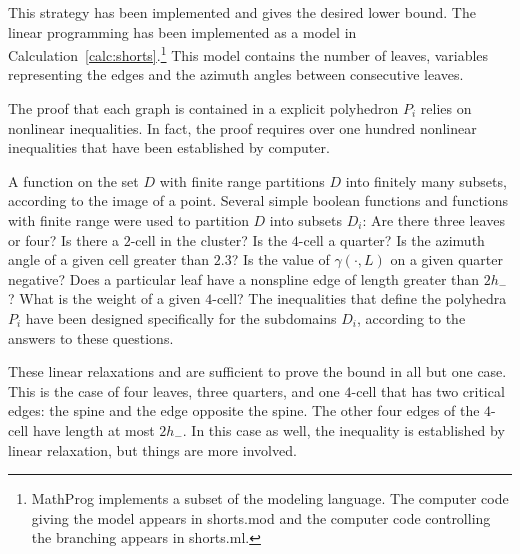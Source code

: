 This strategy has been implemented and gives the desired lower bound.
The linear programming has been implemented as a  model
in Calculation~\ref{calc:shorts}.\footnote{MathProg implements a
subset of the  modeling language.  The computer code
giving the model appears in shorts.mod and the computer code
controlling the branching appears in shorts.ml.}  This model
contains the number of leaves, variables representing the edges and
the azimuth angles between consecutive leaves.

The proof that each graph is contained in a explicit polyhedron $P_i$
relies on nonlinear inequalities.  In fact, the proof requires over
one hundred nonlinear inequalities that have been established by
computer.

A function on the set $D$ with finite range partitions $D$ into
finitely many subsets, according to the image of a point.  Several
simple boolean functions and functions with finite range were used to
partition $D$ into subsets $D_i$: Are there three leaves or four?  Is
there a $2$-cell in the cluster?  Is the $4$-cell a quarter?  Is the
azimuth angle of a given cell greater than $2.3$?  Is the value of
$\gamma(\cdot,L)$ on a given quarter negative? Does a particular leaf have a
nonspline edge of length greater than $2h_-$?  What is the weight of a
given $4$-cell?  The inequalities that define the polyhedra $P_i$ have
been designed specifically for the subdomains $D_i$, according to the
answers to these questions.

These linear relaxations and are sufficient to prove the bound in all
but one case.  This is the case of four leaves, three quarters, and
one $4$-cell that has two critical edges: the spine and the edge
opposite the spine.  The other four edges of the $4$-cell have length
at most $2h_-$.  In this case as well, the inequality is established
by linear relaxation, but things are more involved.

